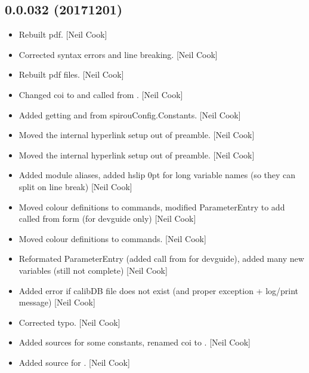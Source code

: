 \documentclass[a4paper,10pt,english]{report}
\begin{document}
\subsection{0.0.032 (2017\sphinxhyphen{}12\sphinxhyphen{}01)}
\label{\detokenize{misc/changelog:id538}}\begin{itemize}
\item {} 
Rebuilt pdf. {[}Neil Cook{]}

\item {} 
Corrected syntax errors and line breaking. {[}Neil Cook{]}

\item {} 
Rebuilt pdf files. {[}Neil Cook{]}

\item {} 
Changed coi to  and called from . {[}Neil Cook{]}

\item {} 
Added getting  and  from spirouConfig.Constants.
{[}Neil Cook{]}

\item {} 
Moved the internal hyperlink setup out of preamble. {[}Neil Cook{]}

\item {} 
Moved the internal hyperlink setup out of preamble. {[}Neil Cook{]}

\item {} 
Added module aliases, added hslip 0pt for long variable names (so they
can split on line break) {[}Neil Cook{]}

\item {} 
Moved colour definitions to commands, modified ParameterEntry to add
called from form (for devguide only) {[}Neil Cook{]}

\item {} 
Moved colour definitions to commands. {[}Neil Cook{]}

\item {} 
Reformated ParameterEntry (added call from for devguide), added many
new variables (still not complete) {[}Neil Cook{]}

\item {} 
Added error if calibDB file does not exist (and proper exception +
log/print message) {[}Neil Cook{]}

\item {} 
Corrected typo. {[}Neil Cook{]}

\item {} 
Added sources for some constants, renamed coi to . {[}Neil
Cook{]}

\item {} 
Added source for . {[}Neil Cook{]}

\end{itemize}
\end{document}
